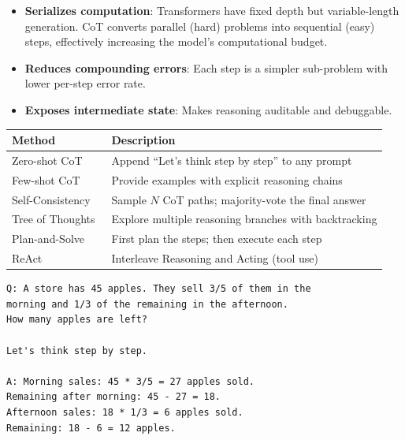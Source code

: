 \begin{itemize}
  \item \textbf{Serializes computation}: Transformers have fixed depth but variable-length generation. CoT converts parallel (hard) problems into sequential (easy) steps, effectively increasing the model’s computational budget.
  \item \textbf{Reduces compounding errors}: Each step is a simpler sub-problem with lower per-step error rate.
  \item \textbf{Exposes intermediate state}: Makes reasoning auditable and debuggable.
\end{itemize}

\begin{keybox}
\small
\begin{tabular}{@{}ll@{}}
\toprule
\textbf{Method} & \textbf{Description} \\
\midrule
Zero-shot CoT~\cite{kojima2022large} & Append ``Let's think step by step'' to any prompt \\
Few-shot CoT~\cite{wei2022chain} & Provide examples with explicit reasoning chains \\
Self-Consistency~\cite{wang2023selfconsistency} & Sample $N$ CoT paths; majority-vote the final answer \\
Tree of Thoughts~\cite{yao2023tree} & Explore multiple reasoning branches with backtracking \\
Plan-and-Solve~\cite{wang2023planandsolve} & First plan the steps; then execute each step \\
ReAct~\cite{yao2023react} & Interleave Reasoning and Acting (tool use) \\
\bottomrule
\end{tabular}
\end{keybox}

\begin{examplebox}
\begin{lstlisting}
Q: A store has 45 apples. They sell 3/5 of them in the 
morning and 1/3 of the remaining in the afternoon. 
How many apples are left?

Let's think step by step.

A: Morning sales: 45 * 3/5 = 27 apples sold.
Remaining after morning: 45 - 27 = 18.
Afternoon sales: 18 * 1/3 = 6 apples sold.
Remaining: 18 - 6 = 12 apples.
\end{lstlisting}
\end{examplebox}

